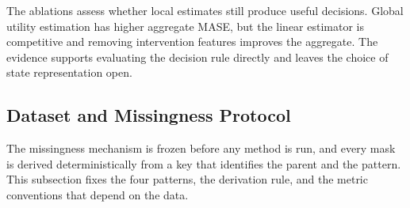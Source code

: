 \documentclass{article}
\begin{document}
The ablations assess whether local estimates still produce useful decisions.
Global utility estimation has higher aggregate MASE, but the linear estimator is competitive
and removing intervention features improves the aggregate. The evidence supports evaluating
the decision rule directly and leaves the choice of state representation open.

\begin{table}[htbp]
  \caption{The local transfer assumption, measured. Pairs are every admissible non-reference
  action of every evaluation request, split into five bins by the mean distance of the
  neighbourhood the rule retrieved. Distance is in the standardised state space, error is
  $|\hat\mu_a - g_a|$ between the estimate the rule acted on and what the action did, and sign
  agreement is how often the two share a sign. The frozen configuration is reused and nothing
  is selected here.}
  \label{tab:app-transfer}
  \centering
  \small
  \setlength{\tabcolsep}{4pt}
\end{table}

\subsection{Dataset and Missingness Protocol}
\label{app:data-protocol}
The missingness mechanism is frozen before any method is run, and every mask is derived
deterministically from a key that identifies the parent and the pattern. This subsection fixes
the four patterns, the derivation rule, and the metric conventions that depend on the data.
\end{document}

